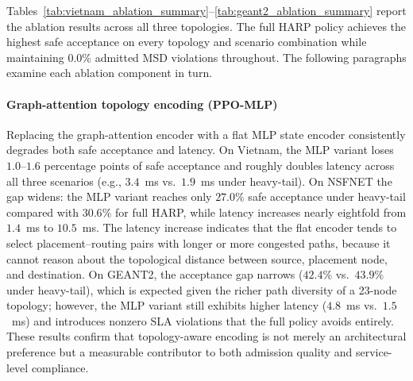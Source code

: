 \documentclass[final,5p]{elsarticle}
\begin{document}
Tables~\ref{tab:vietnam_ablation_summary}--\ref{tab:geant2_ablation_summary} report the ablation results across all three topologies. The full HARP policy achieves the highest safe acceptance on every topology and scenario combination while maintaining \(0.0\%\) admitted MSD violations throughout. The following paragraphs examine each ablation component in turn.

\paragraph{Graph-attention topology encoding (PPO-MLP)}
Replacing the graph-attention encoder with a flat MLP state encoder consistently degrades both safe acceptance and latency. On Vietnam, the MLP variant loses \(1.0\)--\(1.6\) percentage points of safe acceptance and roughly doubles latency across all three scenarios (e.g., \(3.4\)~ms vs.\ \(1.9\)~ms under heavy-tail). On NSFNET the gap widens: the MLP variant reaches only \(27.0\%\) safe acceptance under heavy-tail compared with \(30.6\%\) for full HARP, while latency increases nearly eightfold from \(1.4\)~ms to \(10.5\)~ms. The latency increase indicates that the flat encoder tends to select placement--routing pairs with longer or more congested paths, because it cannot reason about the topological distance between source, placement node, and destination. On GEANT2, the acceptance gap narrows (\(42.4\%\) vs.\ \(43.9\%\) under heavy-tail), which is expected given the richer path diversity of a 23-node topology; however, the MLP variant still exhibits higher latency (\(4.8\)~ms vs.\ \(1.5\)~ms) and introduces nonzero SLA violations that the full policy avoids entirely. These results confirm that topology-aware encoding is not merely an architectural preference but a measurable contributor to both admission quality and service-level compliance.
\end{document}
